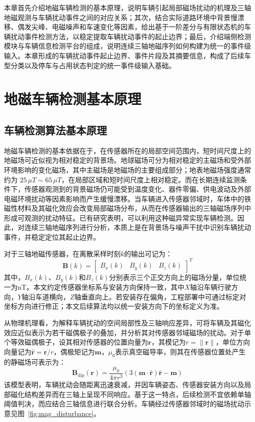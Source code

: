 \documentclass{xdupgthesis}
\begin{document}
本章首先介绍地磁车辆检测的基本原理，说明车辆引起局部磁场扰动的机理及三轴地磁观测与车辆扰动事件之间的对应关系；其次，结合实际道路环境中背景慢漂移、偶发尖峰、电磁噪声和车速变化等因素，给出基于一阶差分与有限状态机的车辆扰动事件检测方法，以稳定提取车辆扰动事件的起止边界；最后，介绍端侧检测模块与车辆信息检测平台的组成，说明连续三轴地磁序列如何构建为统一的事件级输入。本章形成的车辆扰动事件起止边界、事件片段及其摘要信息，构成了后续车型分类以及停车与占用状态判定的统一事件级输入基础。

\section{地磁车辆检测基本原理}
\label{sec:ch2_principle}

\subsection{车辆检测算法基本原理}
\label{sec:ch2_basic}

地磁车辆检测的基本依据在于，在传感器所在的局部空间范围内，短时间尺度上的地磁场可近似视为相对稳定的背景场。地球磁场可分为相对稳定的主磁场和受外部环境影响的变化磁场，其中主磁场是地磁场的主要组成部分；地表地磁场强度通常约为 $25\,\mu T \sim 65\,\mu T$，在局部区域和短时间尺度上相对稳定。而在长期连续监测条件下，传感器观测到的背景磁场仍可能受到温度变化、器件零偏、供电波动及外部电磁环境扰动等因素影响而产生缓慢漂移。当车辆进入传感器邻域时，车体中的铁磁性材料及其磁化效应会改变局部磁场分布，从而在传感器输出的三轴磁场序列中形成可观测的扰动特征。已有研究表明，可以利用这种磁异常实现车辆检测\cite{marshall1978vehicle}。因此，对连续三轴地磁序列进行分析，本质上是在背景场与噪声干扰中识别车辆扰动事件，并稳定定位其起止边界。

对于三轴地磁传感器，在离散采样时刻$k$的输出可记为：
\begin{equation}
\mathbf{B}(k)=
\begin{bmatrix}
B_x(k) & B_y(k) & B_z(k)
\end{bmatrix}^{T}
\end{equation}
其中，$B_x(k)$、$B_y(k)$和$B_z(k)$分别表示三个正交方向上的磁场分量，单位统一为nT。本文约定传感器坐标系与安装方向保持一致，其中$X$轴沿车辆行驶方向，$Y$轴沿车道横向，$Z$轴垂直向上。若安装存在偏角，工程部署中可通过标定对坐标方向进行修正；本文后续算法均以统一安装方向下的坐标定义为准。

从物理机理看，为解释车辆扰动的空间局部性及三轴响应差异，可将车辆及其磁化效应近似表示为若干磁偶极子的叠加，并分析其对传感器邻域磁场的扰动。对于单个等效磁偶极子，设其相对传感器的位置向量为$\mathbf{r}$，其模记为$r=\|\mathbf{r}\|$，单位方向向量记为$\hat{\mathbf{r}}=\mathbf{r}/r$，偶极矩记为$\mathbf{m}$，$\mu_0$表示真空磁导率，则其在传感器位置处产生的静磁场可表示为：
\begin{equation}
\mathbf{B}_{\mathrm{dip}}(\mathbf{r})=
\frac{\mu_{0}}{4\pi r^{3}}
\left(3(\mathbf{m}\cdot \hat{\mathbf{r}})\hat{\mathbf{r}}-\mathbf{m}\right)
\end{equation}
该模型表明，车辆扰动会随距离迅速衰减，并因车辆姿态、传感器安装方向以及局部磁化结构差异而在三轴上呈现不同响应。基于这一特点，后续检测不宜依赖单轴阈值判决，而应结合三轴信息进行联合分析\cite{liu2017threeaxis}。车辆经过传感器邻域时的磁场扰动示意见图~\ref{fig:mag_disturbance}。
\end{document}

